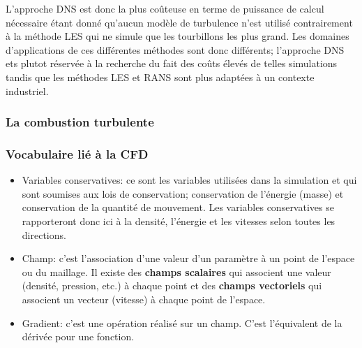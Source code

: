L'approche DNS est donc la plus coûteuse en terme de puissance de calcul nécessaire étant donné qu'aucun modèle de turbulence n'est utilisé contrairement à la méthode LES qui ne simule que les tourbillons les plus grand. Les domaines d'applications de ces différentes méthodes sont donc différents; l'approche DNS ets plutot réservée à la recherche du fait des coûts élevés de telles simulations tandis que les méthodes LES et RANS sont plus adaptées à un contexte industriel.

\subsubsection{La combustion turbulente}


\subsubsection{Vocabulaire lié à la CFD}

\begin{itemize}
\item Variables conservatives: ce sont les variables utilisées dans la simulation et qui sont soumises aux lois de conservation; conservation de l'énergie (masse) et conservation de la quantité de mouvement. Les variables conservatives se rapporteront donc ici à la densité, l'énergie et les vitesses selon toutes les directions.
\item Champ: c'est l'association d'une valeur d'un paramètre à un point de l'espace ou du maillage. Il existe des \textbf{champs scalaires} qui associent une valeur (densité, pression, etc.) à chaque point et des \textbf{champs vectoriels} qui associent un vecteur (vitesse) à chaque point de l'espace.
\item Gradient: c'est une opération réalisé sur un champ. C'est l'équivalent de la dérivée pour une fonction.

\end{itemize}
